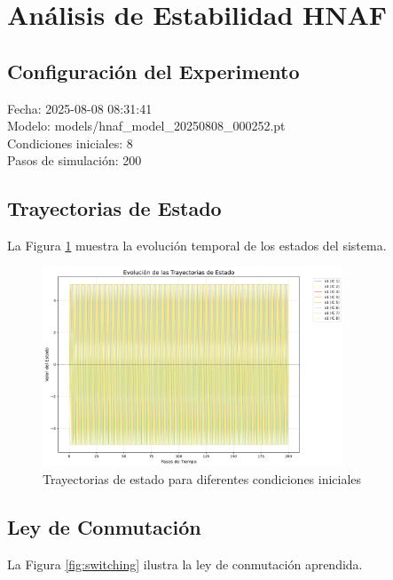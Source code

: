 \section{Análisis de Estabilidad HNAF}

\subsection{Configuración del Experimento}
Fecha: 2025-08-08 08:31:41\\Modelo: models/hnaf_model_20250808_000252.pt\\Condiciones iniciales: 8\\Pasos de simulación: 200

\subsection{Trayectorias de Estado}
La Figura \ref{fig:trajectories} muestra la evolución temporal de los estados del sistema.

\begin{figure}[h]
\centering
\includegraphics[width=0.8\textwidth]{plot_trajectories.png}
\caption{Trayectorias de estado para diferentes condiciones iniciales}
\label{fig:trajectories}
\end{figure}

\subsection{Ley de Conmutación}
La Figura \ref{fig:switching} ilustra la ley de conmutación aprendida.

